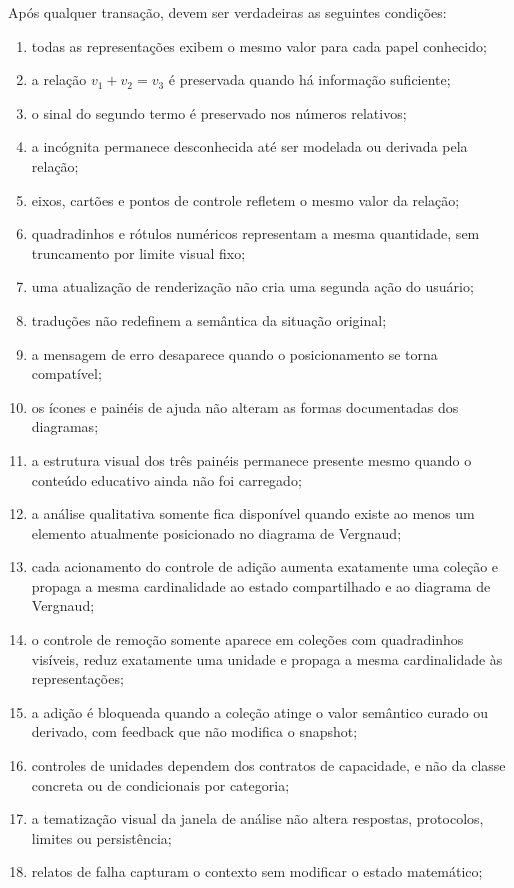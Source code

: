 \documentclass[12pt,a4paper]{article}
\begin{document}
Após qualquer transação, devem ser verdadeiras as seguintes condições:
\begin{enumerate}[noitemsep]
  \item todas as representações exibem o mesmo valor para cada papel conhecido;
  \item a relação $v_1+v_2=v_3$ é preservada quando há informação suficiente;
  \item o sinal do segundo termo é preservado nos números relativos;
  \item a incógnita permanece desconhecida até ser modelada ou derivada pela relação;
  \item eixos, cartões e pontos de controle refletem o mesmo valor da relação;
  \item quadradinhos e rótulos numéricos representam a mesma quantidade, sem truncamento por limite visual fixo;
  \item uma atualização de renderização não cria uma segunda ação do usuário;
  \item traduções não redefinem a semântica da situação original;
  \item a mensagem de erro desaparece quando o posicionamento se torna compatível;
  \item os ícones e painéis de ajuda não alteram as formas documentadas dos diagramas;
  \item a estrutura visual dos três painéis permanece presente mesmo quando o conteúdo educativo ainda não foi carregado;
  \item a análise qualitativa somente fica disponível quando existe ao menos um elemento atualmente posicionado no diagrama de Vergnaud;
  \item cada acionamento do controle de adição aumenta exatamente uma coleção e propaga a mesma cardinalidade ao estado compartilhado e ao diagrama de Vergnaud;
  \item o controle de remoção somente aparece em coleções com quadradinhos visíveis, reduz exatamente uma unidade e propaga a mesma cardinalidade às representações;
  \item a adição é bloqueada quando a coleção atinge o valor semântico curado ou derivado, com feedback que não modifica o snapshot;
  \item controles de unidades dependem dos contratos de capacidade, e não da classe concreta ou de condicionais por categoria;
  \item a tematização visual da janela de análise não altera respostas, protocolos, limites ou persistência;
  \item relatos de falha capturam o contexto sem modificar o estado matemático;

\end{enumerate}
\end{document}
